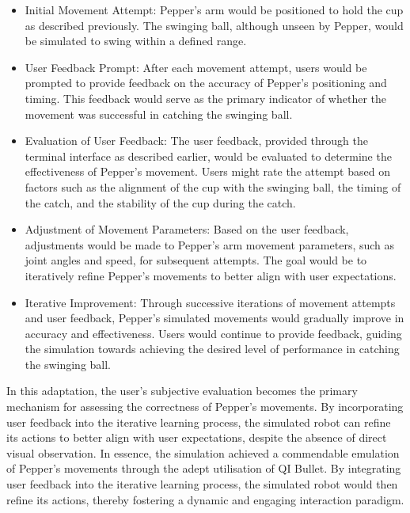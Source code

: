 \documentclass{article}
\begin{document}
    \begin{itemize}
        \item Initial Movement Attempt: Pepper's arm would be positioned to hold the cup as described previously. The swinging ball, although unseen by Pepper, would be simulated to swing within a defined range.
        \item User Feedback Prompt: After each movement attempt, users would be prompted to provide feedback on the accuracy of Pepper's positioning and timing. This feedback would serve as the primary indicator of whether the movement was successful in catching the swinging ball.
        \item Evaluation of User Feedback: The user feedback, provided through the terminal interface as described earlier, would be evaluated to determine the effectiveness of Pepper's movement. Users might rate the attempt based on factors such as the alignment of the cup with the swinging ball, the timing of the catch, and the stability of the cup during the catch.
        \item Adjustment of Movement Parameters: Based on the user feedback, adjustments would be made to Pepper's arm movement parameters, such as joint angles and speed, for subsequent attempts. The goal would be to iteratively refine Pepper's movements to better align with user expectations.
        \item Iterative Improvement: Through successive iterations of movement attempts and user feedback, Pepper's simulated movements would gradually improve in accuracy and effectiveness. Users would continue to provide feedback, guiding the simulation towards achieving the desired level of performance in catching the swinging ball.
    \end{itemize}
    
    In this adaptation, the user's subjective evaluation becomes the primary mechanism for assessing the correctness of Pepper's movements. By incorporating user feedback into the iterative learning process, the simulated robot can refine its actions to better align with user expectations, despite the absence of direct visual observation.
    In essence, the simulation achieved a commendable emulation of Pepper's movements through the adept utilisation of QI Bullet. By integrating user feedback into the iterative learning process, the simulated robot would then refine its actions, thereby fostering a dynamic and engaging interaction paradigm.
\end{document}
